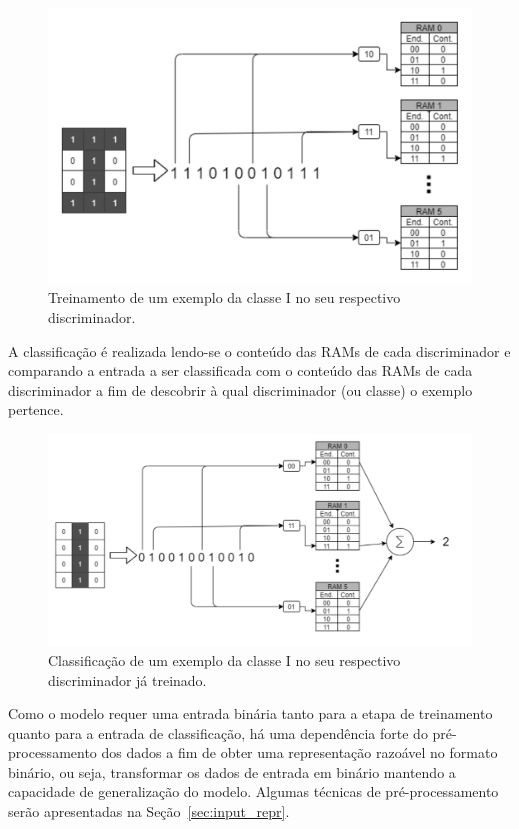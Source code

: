 \begin{figure}[!ht]
    \centering
    \includegraphics[width=5.0in]{img/wisard_training.pdf}
    \caption{Treinamento de um exemplo da classe I no seu respectivo discriminador.}
    \label{fig:wsd_train}
\end{figure}

A classificação é realizada lendo-se o conteúdo das RAMs de cada discriminador e comparando a entrada a ser classificada com o conteúdo das RAMs de cada discriminador a fim de descobrir à qual discriminador (ou classe) o exemplo pertence.

\begin{figure}[!ht]
    \centering
    \includegraphics[width=5.0in]{img/wisard_classification.pdf}
    \caption{Classificação de um exemplo da classe I no seu respectivo discriminador já treinado.}
    \label{fig:wsd_classification}
\end{figure}

Como o modelo requer uma entrada binária tanto para a etapa de treinamento quanto para a entrada de classificação, há uma dependência forte do pré-processamento dos dados a fim de obter uma representação razoável no formato binário, ou seja, transformar os dados de entrada em binário mantendo a capacidade de generalização do modelo. Algumas técnicas de pré-processamento serão apresentadas na Seção~\ref{sec:input_repr}.

